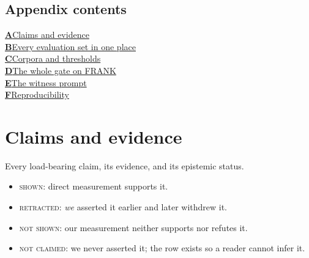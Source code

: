 \documentclass[11pt]{article}
\begin{document}


\appendix

\clearpage
\onecolumn

\noindent\begin{minipage}{\textwidth}
\subsection*{Appendix contents}
\noindent
\hyperref[app:claims]{\textbf{A}\quad Claims and evidence} \dotfill \pageref{app:claims}\\
\hyperref[app:sets]{\textbf{B}\quad Every evaluation set in one place} \dotfill \pageref{app:sets}\\
\hyperref[app:corpora]{\textbf{C}\quad Corpora and thresholds} \dotfill \pageref{app:corpora}\\
\hyperref[app:frank]{\textbf{D}\quad The whole gate on FRANK} \dotfill \pageref{app:frank}\\
\hyperref[app:prompts]{\textbf{E}\quad The witness prompt} \dotfill \pageref{app:prompts}\\
\hyperref[app:repro]{\textbf{F}\quad Reproducibility} \dotfill \pageref{app:repro}
\end{minipage}
\bigskip

\section{Claims and evidence}
\label{app:claims}

Every load-bearing claim, its evidence, and its epistemic status.

\begin{itemize}\itemsep2pt
\item \textsc{shown}: direct measurement supports it.
\item \textsc{retracted}: \emph{we} asserted it earlier and later withdrew it.
\item \textsc{not shown}: our measurement neither supports nor refutes it.
\item \textsc{not claimed}: we never asserted it; the row exists so a reader cannot
      infer it.
\end{itemize}
\end{document}
